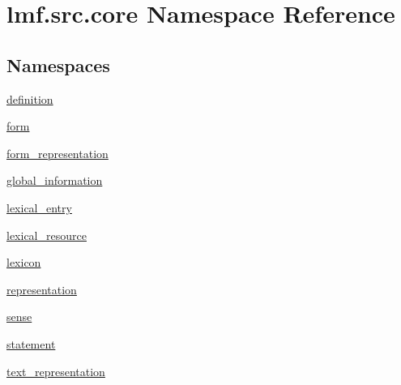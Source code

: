 \hypertarget{namespacelmf_1_1src_1_1core}{\section{lmf.\+src.\+core Namespace Reference}
\label{namespacelmf_1_1src_1_1core}
}
\subsection*{Namespaces}
\begin{DoxyCompactItemize}
\item 
 \hyperlink{namespacelmf_1_1src_1_1core_1_1definition}{definition}
\item 
 \hyperlink{namespacelmf_1_1src_1_1core_1_1form}{form}
\item 
 \hyperlink{namespacelmf_1_1src_1_1core_1_1form__representation}{form\+\_\+representation}
\item 
 \hyperlink{namespacelmf_1_1src_1_1core_1_1global__information}{global\+\_\+information}
\item 
 \hyperlink{namespacelmf_1_1src_1_1core_1_1lexical__entry}{lexical\+\_\+entry}
\item 
 \hyperlink{namespacelmf_1_1src_1_1core_1_1lexical__resource}{lexical\+\_\+resource}
\item 
 \hyperlink{namespacelmf_1_1src_1_1core_1_1lexicon}{lexicon}
\item 
 \hyperlink{namespacelmf_1_1src_1_1core_1_1representation}{representation}
\item 
 \hyperlink{namespacelmf_1_1src_1_1core_1_1sense}{sense}
\item 
 \hyperlink{namespacelmf_1_1src_1_1core_1_1statement}{statement}
\item 
 \hyperlink{namespacelmf_1_1src_1_1core_1_1text__representation}{text\+\_\+representation}
\end{DoxyCompactItemize}
